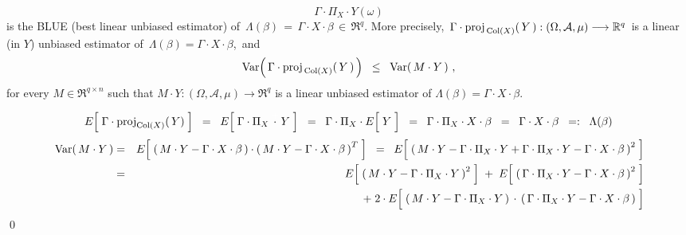 \begin{theorem}
\begin{equation*}
\Gamma \cdot \Pi_{X} \cdot Y(\omega)
\end{equation*}
is the BLUE (best linear unbiased estimator) of
\,$\Lambda(\beta) \,=\, \Gamma \cdot X \cdot \beta \,\in\, \Re^{q}$.
More precisely,
\,$\Gamma \cdot \textnormal{proj}_{\,\textnormal{Col}(X)}\!\left(\,Y\,\right) : (\Omega,\mathcal{A},\mu) \longrightarrow \mathbb{R}^{q}$\,
is a linear (in $Y$) unbiased estimator of
\,$\Lambda(\beta) = \Gamma \cdot X \cdot \beta$,\, and
\begin{equation*}
\textnormal{Var}\!\left(\,\Gamma \cdot \textnormal{proj}_{\,\textnormal{Col}(X)}\!\left(\,Y\,\right)\,\right)
\;\; \leq \;\;
	\textnormal{Var}\!\left(\,M \cdot Y\,\right)\,,
\end{equation*}
for every $M \in \Re^{q \times n}$ such that
$M \cdot Y : (\Omega,\mathcal{A},\mu) \longrightarrow \Re^{q}$
is a linear unbiased estimator of
$\Lambda(\beta) = \Gamma \cdot X \cdot \beta$.
\end{theorem}
\proof
\begin{equation*}
E\!\left[\;\Gamma \cdot \proj_{\Col(X)}(\,Y)\;\right]
\;\; = \;\;
	E\!\left[\;\Gamma \cdot \Pi_{X} \overset{{\color{white}+}}{\cdot} Y\;\right]
\;\; = \;\;
	\Gamma \cdot \Pi_{X} \cdot E\!\left[\;\overset{{\color{white}.}}{Y}\;\right]
\;\; = \;\;
	\Gamma \cdot \Pi_{X} \cdot X \cdot \beta
\;\; = \;\;
	\Gamma \cdot X \cdot \beta
\;\; =: \;\;
	\Lambda(\beta)
\end{equation*}
\begin{eqnarray*}
\Var\!\left(\,M \cdot Y\,\right)
&=&
	E\!\left[\;
		\left(\,M \cdot Y - \Gamma \cdot X \cdot \beta\,\right)
		\cdot
		\left(\,M \cdot Y - \Gamma \cdot X \cdot \beta\,\right)^{T}
		\;\right]
\;\;=\;\;
	E\!\left[\;\left(\,
		M \cdot Y
		- \Gamma \cdot \Pi_{X} \cdot Y
		+ \Gamma \cdot \Pi_{X} \cdot Y
		- \Gamma \cdot X \cdot \beta
		\,\right)^{2}\;\right]
\\
&=&
	E\!\left[\;\left(\,
		M \cdot Y - \Gamma \cdot \Pi_{X} \cdot Y
		\,\right)^{2}\;\right]
	\;+\;
	E\!\left[\;\left(\,
		\Gamma \cdot \Pi_{X} \cdot Y - \Gamma \cdot X \cdot \beta
		\,\right)^{2}\;\right]
\\
&&
	\;+\;
	2 \cdot
	E\!\left[\;
		\left(\,M \cdot Y - \Gamma \cdot \Pi_{X} \cdot Y\,\right)
		\overset{{\color{white}+}}{\cdot}
		\left(\,\Gamma \cdot \Pi_{X} \cdot Y - \Gamma \cdot X \cdot \beta\,\right)
		\;\right]
\end{eqnarray*}
\qed


